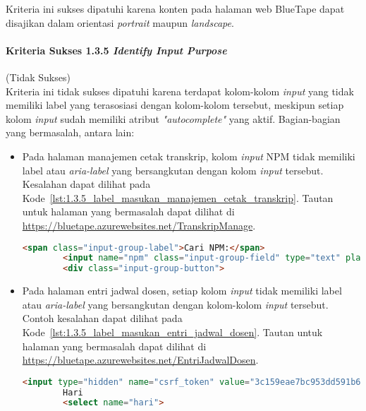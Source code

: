 Kriteria ini sukses dipatuhi karena konten pada halaman web BlueTape dapat disajikan dalam orientasi \textit{portrait} maupun \textit{landscape}.

\paragraph{Kriteria Sukses 1.3.5 \textit{Identify Input Purpose}}
\label{par:kepatuhan_bluetape_kriteria_sukses_1.3.5}
(Tidak Sukses)\\

Kriteria ini tidak sukses dipatuhi karena terdapat kolom-kolom \textit{input} yang tidak memiliki label yang terasosiasi dengan kolom-kolom tersebut, meskipun setiap kolom \textit{input} sudah memiliki atribut \textit{"autocomplete"} yang aktif. Bagian-bagian yang bermasalah, antara lain:
\begin{itemize}
    \item Pada halaman manajemen cetak transkrip, kolom \textit{input} NPM tidak memiliki label atau \textit{aria-label} yang bersangkutan dengan kolom \textit{input} tersebut. Kesalahan dapat dilihat pada \mbox{Kode \ref{lst:1.3.5_label_masukan_manajemen_cetak_transkrip}}. Tautan untuk halaman yang bermasalah dapat dilihat di \url{https://bluetape.azurewebsites.net/TranskripManage}.
    \begin{lstlisting}[frame=single, label={lst:1.3.5_label_masukan_manajemen_cetak_transkrip}, language=HTML, caption=Pelanggaran Kriteria Sukses 1.3.5 pada Halaman Manajemen Cetak Transkrip]
        <span class="input-group-label">Cari NPM:</span>
        <input name="npm" class="input-group-field" type="text" placeholder="2013730013" maxlength="10" minlength="10"/>
        <div class="input-group-button">
    \end{lstlisting}
    
    \item Pada halaman entri jadwal dosen, setiap kolom \textit{input} tidak memiliki label atau \textit{aria-label} yang bersangkutan dengan kolom-kolom \textit{input} tersebut. Contoh kesalahan dapat dilihat pada \mbox{Kode \ref{lst:1.3.5_label_masukan_entri_jadwal_dosen}}. Tautan untuk halaman yang bermasalah dapat dilihat di \url{https://bluetape.azurewebsites.net/EntriJadwalDosen}.
    \begin{lstlisting}[frame=single, label={lst:1.3.5_label_masukan_entri_jadwal_dosen}, language=HTML, caption=Pelanggaran Kriteria Sukses 1.3.5 pada Halaman Entri Jadwal Dosen]
        <input type="hidden" name="csrf_token" value="3c159eae7bc953dd591b679c080ed066" />
        Hari
        <select name="hari">
    \end{lstlisting}
\end{itemize}

